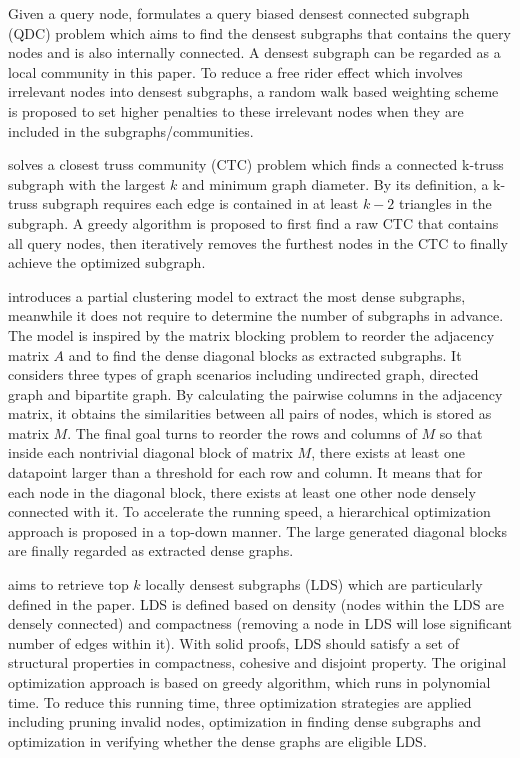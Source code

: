 Given a query node, \cite{wu2015robust} formulates a query biased densest connected subgraph (QDC) problem which aims to find the densest subgraphs that contains the query nodes and is also internally connected. A densest subgraph can be regarded as a local community in this paper. To reduce a free rider effect which involves irrelevant nodes into densest subgraphs, a random walk based weighting scheme is proposed to set higher penalties to these irrelevant nodes when they are included in the subgraphs/communities. 

\cite{huang2015approximate} solves a closest truss community (CTC) problem which finds a connected k-truss subgraph with the largest $k$ and minimum graph diameter.  By its definition, a k-truss subgraph requires each edge is contained in at least $k-2$ triangles  in the subgraph. A greedy algorithm is proposed to first find a raw CTC that contains all query nodes, then iteratively removes the furthest nodes in the CTC to finally achieve the optimized subgraph.
 
\cite{chen2012dense} introduces a partial clustering model to extract the most dense subgraphs, meanwhile it does not require to determine the number of subgraphs in advance. The model is inspired by the matrix blocking problem to reorder the adjacency matrix $A$ and to find the dense diagonal blocks as extracted subgraphs. It considers three types of graph scenarios including undirected graph, directed graph and bipartite graph. By calculating the pairwise columns in the adjacency matrix, it obtains the similarities between all pairs of nodes, which is stored as matrix $M$. The final goal turns to reorder the rows and columns of $M$ so that inside each nontrivial diagonal block of matrix $M$, there exists at least one datapoint larger than a threshold for each row and column. It means that for each node in the diagonal block, there exists at least one other node densely connected with it. To accelerate the running speed, a hierarchical optimization approach is proposed in a top-down manner. The large generated diagonal blocks are finally regarded as extracted dense graphs. 

 \cite{qin2015locally} aims to retrieve top $k$ locally densest subgraphs (LDS) which are particularly defined in the paper. LDS is defined based on density (nodes within the LDS are densely connected) and compactness (removing a node in LDS will lose significant number of edges within it). With solid proofs, LDS  should satisfy a set of structural properties in compactness, cohesive and disjoint property. The original optimization approach is based on greedy algorithm, which runs in polynomial time. To reduce this running time, three optimization strategies are applied including pruning invalid nodes, optimization in finding dense subgraphs and optimization in verifying whether the dense graphs are eligible LDS.
 
